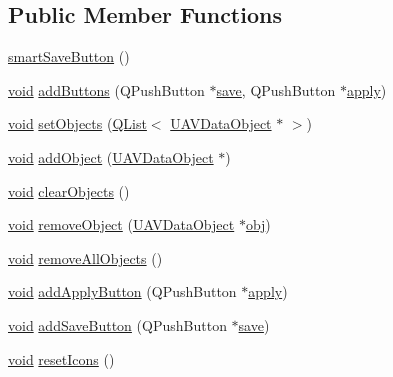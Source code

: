 \subsection*{Public Member Functions}
\begin{DoxyCompactItemize}
\item 
\hyperlink{group___u_a_v_object_widget_utils_gaea82e458c940bce5635289974c09f02f}{smart\-Save\-Button} ()
\item 
\hyperlink{group___u_a_v_objects_plugin_ga444cf2ff3f0ecbe028adce838d373f5c}{void} \hyperlink{group___u_a_v_object_widget_utils_gaf6869cfd1fefcbd90df4481101aedae0}{add\-Buttons} (Q\-Push\-Button $\ast$\hyperlink{group___u_a_v_object_widget_utils_gad0e6541ace97075634254ba3b1cc9bf9}{save}, Q\-Push\-Button $\ast$\hyperlink{group___u_a_v_object_widget_utils_ga453b1bbd8b56fa6af4f362b00221b265}{apply})
\item 
\hyperlink{group___u_a_v_objects_plugin_ga444cf2ff3f0ecbe028adce838d373f5c}{void} \hyperlink{group___u_a_v_object_widget_utils_gabc52b717610cbaa7e592ca114e280a7a}{set\-Objects} (\hyperlink{class_q_list}{Q\-List}$<$ \hyperlink{class_u_a_v_data_object}{U\-A\-V\-Data\-Object} $\ast$ $>$)
\item 
\hyperlink{group___u_a_v_objects_plugin_ga444cf2ff3f0ecbe028adce838d373f5c}{void} \hyperlink{group___u_a_v_object_widget_utils_gac2164be4d041b63639a01ac473d95463}{add\-Object} (\hyperlink{class_u_a_v_data_object}{U\-A\-V\-Data\-Object} $\ast$)
\item 
\hyperlink{group___u_a_v_objects_plugin_ga444cf2ff3f0ecbe028adce838d373f5c}{void} \hyperlink{group___u_a_v_object_widget_utils_ga0907c8e3ee212fbe30183359c0d8bc1a}{clear\-Objects} ()
\item 
\hyperlink{group___u_a_v_objects_plugin_ga444cf2ff3f0ecbe028adce838d373f5c}{void} \hyperlink{group___u_a_v_object_widget_utils_ga3543686402e11b7eb8f0822c0a9bb4de}{remove\-Object} (\hyperlink{class_u_a_v_data_object}{U\-A\-V\-Data\-Object} $\ast$\hyperlink{glext_8h_a0c0d4701a6c89f4f7f0640715d27ab26}{obj})
\item 
\hyperlink{group___u_a_v_objects_plugin_ga444cf2ff3f0ecbe028adce838d373f5c}{void} \hyperlink{group___u_a_v_object_widget_utils_ga2e09103bceedaf1f2756c7a688da035c}{remove\-All\-Objects} ()
\item 
\hyperlink{group___u_a_v_objects_plugin_ga444cf2ff3f0ecbe028adce838d373f5c}{void} \hyperlink{group___u_a_v_object_widget_utils_gab4059d84ec9c8e40beed303a7ad8550a}{add\-Apply\-Button} (Q\-Push\-Button $\ast$\hyperlink{group___u_a_v_object_widget_utils_ga453b1bbd8b56fa6af4f362b00221b265}{apply})
\item 
\hyperlink{group___u_a_v_objects_plugin_ga444cf2ff3f0ecbe028adce838d373f5c}{void} \hyperlink{group___u_a_v_object_widget_utils_ga85e413cf895d8a514e748a8ebf6a67ec}{add\-Save\-Button} (Q\-Push\-Button $\ast$\hyperlink{group___u_a_v_object_widget_utils_gad0e6541ace97075634254ba3b1cc9bf9}{save})
\item 
\hyperlink{group___u_a_v_objects_plugin_ga444cf2ff3f0ecbe028adce838d373f5c}{void} \hyperlink{group___u_a_v_object_widget_utils_ga851955edd99204e2b209b7fa604129fe}{reset\-Icons} ()
\end{DoxyCompactItemize}


